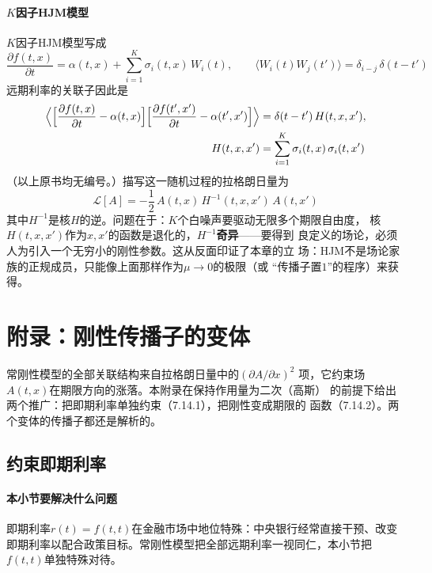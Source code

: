 \paragraph{$K$因子HJM模型}
$K$因子HJM模型写成
\begin{equation*}
\frac{\partial f(t,x)}{\partial t}=\alpha(t,x)+\sum_{i=1}^{K}
\sigma_{i}(t,x)\,W_{i}(t),
\qquad
\langle W_{i}(t)W_{j}(t')\rangle=\delta_{i-j}\,\delta(t-t')
\end{equation*}
远期利率的关联子因此是
\begin{align*}
\Bigl\langle\Bigl[\frac{\partial f(t,x)}{\partial t}-\alpha(t,x)\Bigr]
\Bigl[\frac{\partial f(t',x')}{\partial t}-\alpha(t',x')\Bigr]\Bigr\rangle
&=\delta(t-t')\,H(t,x,x'),\\
H(t,x,x')&=\sum_{i=1}^{K}\sigma_{i}(t,x)\,\sigma_{i}(t,x')
\end{align*}
（以上原书均无编号。）描写这一随机过程的拉格朗日量为
\begin{equation*}
\mathcal{L}[A]=-\frac{1}{2}\,A(t,x)\,H^{-1}(t,x,x')\,A(t,x')
\end{equation*}
其中$H^{-1}$是核$H$的逆。问题在于：$K$个白噪声要驱动无限多个期限自由度，
核$H(t,x,x')$作为$x,x'$的函数是退化的，$H^{-1}$\textbf{奇异}——要得到
良定义的场论，必须人为引入一个无穷小的刚性参数。这从反面印证了本章的立
场：HJM不是场论家族的正规成员，只能像上面那样作为$\mu\to0$的极限（或
“传播子置$1$”的程序）来获得。

\section{附录：刚性传播子的变体}

常刚性模型的全部关联结构来自拉格朗日量中的$(\partial A/\partial x)^{2}$
项，它约束场$A(t,x)$在期限方向的涨落。本附录在保持作用量为二次（高斯）
的前提下给出两个推广：把即期利率单独约束（7.14.1），把刚性变成期限的
函数（7.14.2）。两个变体的传播子都还是解析的。

\subsection{约束即期利率}

\paragraph{本小节要解决什么问题}
即期利率$r(t)=f(t,t)$在金融市场中地位特殊：中央银行经常直接干预、改变
即期利率以配合政策目标。常刚性模型把全部远期利率一视同仁，本小节把
$f(t,t)$单独特殊对待。

